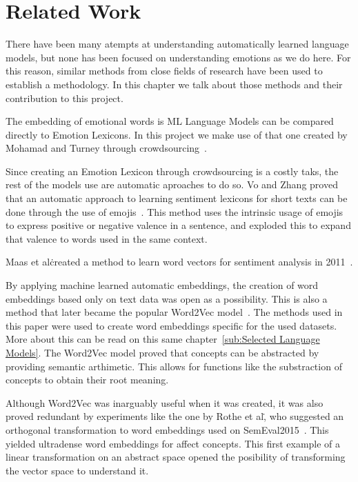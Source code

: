\chapter{Related Work}\label{chap:Related Work}

There have been many atempts at understanding automatically learned language models, but none has been focused on understanding emotions as we do here. For this reason, similar methods from close fields of research have been used to establish a methodology. In this chapter we talk about those methods and their contribution to this project.

The embedding of emotional words is ML Language Models can be compared directly to Emotion Lexicons. In this project we make use of that one created by Mohamad and Turney through crowdsourcing~\cite{mohammad2013crowdsourcing}. %


Since creating an Emotion Lexicon through crowdsourcing is a costly taks, the rest of the models use are automatic aproaches to do so. Vo and Zhang proved that an automatic approach to learning sentiment lexicons for short texts can be done through the use of emojis~\cite{vo2016count}. This method uses the intrinsic usage of emojis to express positive or negative valence in a sentence, and exploded this to expand that valence to words used in the same context.

Maas et al\. created a method to learn word vectors for sentiment analysis in 2011~\cite{maas2011learning}.

By applying machine learned automatic embeddings, the creation of word embeddings based only on text data was open as a possibility. This is also a method that later became the popular Word2Vec model~\cite{mikolov2013word2vec}. The methods used in this paper were used to create word embeddings specific for the used datasets. More about this can be read on this same chapter~\ref{sub:Selected Language Models}. The Word2Vec model proved that concepts can be abstracted by providing semantic arthimetic. This allows for functions like the substraction of concepts to obtain their root meaning.

Although Word2Vec was inarguably useful when it was created, it was also proved redundant by experiments like the one by Rothe et al\., who suggested an orthogonal transformation to word embeddings used on SemEval2015~\cite{rothe2016orthogonal}. This yielded ultradense word embeddings for affect concepts. This first example of a linear transformation on an abstract space opened the posibility of transforming the vector space to understand it.


